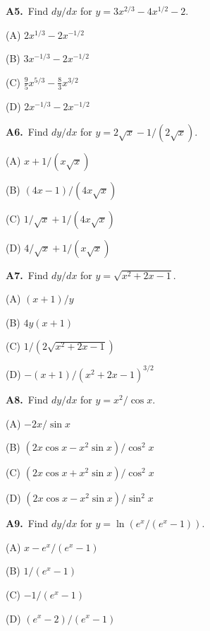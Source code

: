 \documentclass[11pt]{article}
\begin{document}
\bigskip\noindent\textbf{A5.}\ Find $dy/dx$ for $y=3x^{2/3}-4x^{1/2}-2$.
\begin{list}{}{\setlength{\leftmargin}{3em}\setlength{\labelwidth}{2.5em}\setlength{\itemsep}{0pt}\setlength{\topsep}{2pt}}
\item[(A)] $2x^{1/3}-2x^{-1/2}$
\item[(B)] $3x^{-1/3}-2x^{-1/2}$
\item[(C)] $\frac95x^{5/3}-\frac83x^{3/2}$
\item[(D)] $2x^{-1/3}-2x^{-1/2}$
\end{list}

\bigskip\noindent\textbf{A6.}\ Find $dy/dx$ for $y=2\sqrt{x}-1/(2\sqrt{x})$.
\begin{list}{}{\setlength{\leftmargin}{3em}\setlength{\labelwidth}{2.5em}\setlength{\itemsep}{0pt}\setlength{\topsep}{2pt}}
\item[(A)] $x+1/(x\sqrt{x})$
\item[(B)] $(4x-1)/(4x\sqrt{x})$
\item[(C)] $1/\sqrt{x}+1/(4x\sqrt{x})$
\item[(D)] $4/\sqrt{x}+1/(x\sqrt{x})$
\end{list}

\bigskip\noindent\textbf{A7.}\ Find $dy/dx$ for $y=\sqrt{x^2+2x-1}$.
\begin{list}{}{\setlength{\leftmargin}{3em}\setlength{\labelwidth}{2.5em}\setlength{\itemsep}{0pt}\setlength{\topsep}{2pt}}
\item[(A)] $(x+1)/y$
\item[(B)] $4y(x+1)$
\item[(C)] $1/(2\sqrt{x^2+2x-1})$
\item[(D)] $-(x+1)/(x^2+2x-1)^{3/2}$
\end{list}

\bigskip\noindent\textbf{A8.}\ Find $dy/dx$ for $y=x^2/\cos x$.
\begin{list}{}{\setlength{\leftmargin}{3em}\setlength{\labelwidth}{2.5em}\setlength{\itemsep}{0pt}\setlength{\topsep}{2pt}}
\item[(A)] $-2x/\sin x$
\item[(B)] $(2x\cos x-x^2\sin x)/\cos^2x$
\item[(C)] $(2x\cos x+x^2\sin x)/\cos^2x$
\item[(D)] $(2x\cos x-x^2\sin x)/\sin^2x$
\end{list}

\bigskip\noindent\textbf{A9.}\ Find $dy/dx$ for $y=\ln(e^x/(e^x-1))$.
\begin{list}{}{\setlength{\leftmargin}{3em}\setlength{\labelwidth}{2.5em}\setlength{\itemsep}{0pt}\setlength{\topsep}{2pt}}
\item[(A)] $x-e^x/(e^x-1)$
\item[(B)] $1/(e^x-1)$
\item[(C)] $-1/(e^x-1)$
\item[(D)] $(e^x-2)/(e^x-1)$
\end{list}
\end{document}
